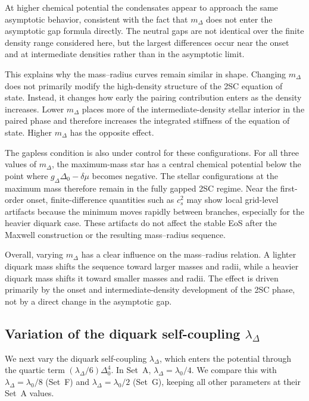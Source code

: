 At higher chemical potential the condensates appear to approach the same
asymptotic behavior, consistent with the fact that \(m_\Delta\) does not
enter the asymptotic gap formula directly. The neutral gaps are not
identical over the finite density range considered here, but the largest
differences occur near the onset and at intermediate densities rather
than in the asymptotic limit.

This explains why the mass--radius curves remain similar in shape.
Changing \(m_\Delta\) does not primarily modify the high-density
structure of the 2SC equation of state. Instead, it changes how early
the pairing contribution enters as the density increases. Lower
\(m_\Delta\) places more of the intermediate-density stellar interior in
the paired phase and therefore increases the integrated stiffness of the
equation of state. Higher \(m_\Delta\) has the opposite effect.

The gapless condition is also under control for these configurations.
For all three values of \(m_\Delta\), the maximum-mass star has a central
chemical potential below the point where
\(g_\Delta\Delta_0-\delta\mu\) becomes negative. The stellar
configurations at the maximum mass therefore remain in the fully gapped
2SC regime. Near the first-order onset, finite-difference quantities
such as \(c_s^2\) may show local grid-level artifacts because the
minimum moves rapidly between branches, especially for the heavier
diquark case. These artifacts do not affect the stable EoS after the
Maxwell construction or the resulting mass--radius sequence.

Overall, varying \(m_\Delta\) has a clear influence on the
mass--radius relation. A lighter diquark mass shifts the sequence toward
larger masses and radii, while a heavier diquark mass shifts it toward
smaller masses and radii. The effect is driven primarily by the onset
and intermediate-density development of the 2SC phase, not by a direct
change in the asymptotic gap.

\subsection*{Variation of the diquark self-coupling \(\lambda_\Delta\)}
\label{subsec:qmd_param_lamdelta}

We next vary the diquark self-coupling \(\lambda_\Delta\), which enters
the potential through the quartic term
\((\lambda_\Delta/6)\Delta_0^4\). In Set~A,
\(\lambda_\Delta=\lambda_0/4\). We compare this with
\(\lambda_\Delta=\lambda_0/8\) (Set~F) and
\(\lambda_\Delta=\lambda_0/2\) (Set~G), keeping all other parameters at
their Set~A values.

